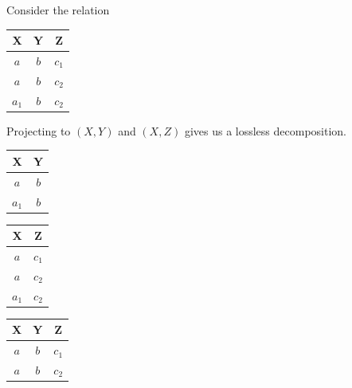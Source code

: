 \documentclass{article}
\begin{document}
    \begin{example}
      Consider the relation 
      \begin{table}[H]
        \centering
        \begin{tabular}{|c|c|c|}
          \hline
          \textbf{X} & \textbf{Y} & \textbf{Z} \\
          \hline
          $a$ & $b$ & $c_1$ \\
          $a$ & $b$ & $c_2$ \\
          $a_1$ & $b$ & $c_2$ \\
          \hline
        \end{tabular}
        \label{tab:ex5}
      \end{table}
      Projecting to $(X, Y)$ and $(X, Z)$ gives us a lossless decomposition. 
      \begin{table}[H]
        \centering
        \begin{minipage}{.32\textwidth}
          \centering
          \begin{tabular}{|c|c|}
            \hline
            \textbf{X} & \textbf{Y} \\
            \hline
            $a$ & $b$ \\
            $a_1$ & $b$ \\
            \hline
          \end{tabular}
          \label{tab:ex6}
        \end{minipage}
        \begin{minipage}{.32\textwidth}
          \centering
          \begin{tabular}{|c|c|}
            \hline
            \textbf{X} & \textbf{Z} \\
            \hline
            $a$ & $c_1$ \\
            $a$ & $c_2$ \\
            $a_1$ & $c_2$ \\
            \hline
          \end{tabular}
          \label{tab:ex7}
        \end{minipage}
        \begin{minipage}{.32\textwidth}
          \centering
          \begin{tabular}{|c|c|c|}
            \hline
            \textbf{X} & \textbf{Y} & \textbf{Z}\\
            \hline
            $a$ & $b$ & $c_1$ \\
            $a$ & $b$ & $c_2$ \\

\end{tabular}
\end{minipage}
\end{table}
\end{example}
\end{document}
